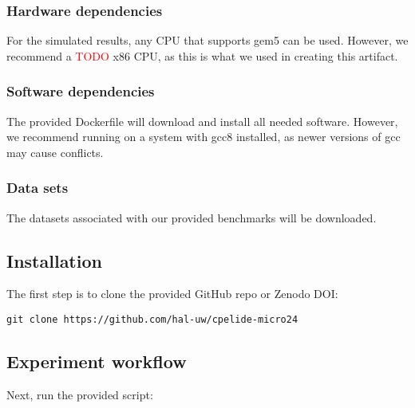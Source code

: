 \documentclass{sigplanconf}
\begin{document}
\subsubsection{Hardware dependencies}
\label{subsubsec:artifact-descrip-hw}

For the simulated results, any CPU that supports gem5 can be used.
However, we recommend a \textcolor{red}{TODO} x86 CPU, as this is what we used in creating this artifact.

\subsubsection{Software dependencies}
\label{subsubsec:artifact-descrip-sw}

The provided Dockerfile will download and install all needed software.
However, we recommend running on a system with gcc8 installed, as newer versions of gcc may cause conflicts.

\subsubsection{Data sets}
\label{subsubsec:artifact-descrip-data}

The datasets associated with our provided benchmarks will be downloaded.


\subsection{Installation}
\label{subsec:artifact-install}


The first step is to clone the provided GitHub repo or Zenodo DOI:

\noindent
\texttt{git clone https://github.com/hal-uw/cpelide-micro24}

\subsection{Experiment workflow}
\label{subsec:artifact-flow}

Next, run the provided script:
\end{document}
